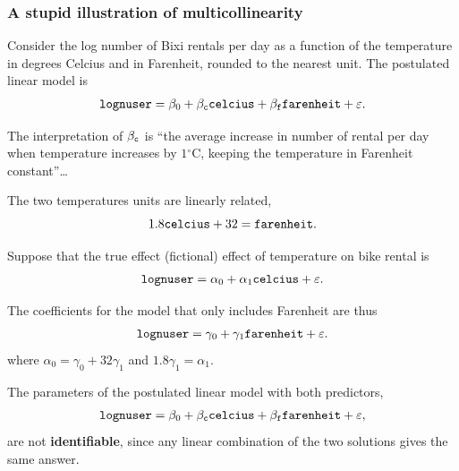 \documentclass{beamer}
\begin{document}
\begin{frame}
\frametitle{A stupid illustration of multicollinearity}
\bi
\item Consider the log number of Bixi rentals per day as a function of the temperature in degrees Celcius and in Farenheit, rounded to the nearest unit. The postulated linear model is 
\begin{align*}
 \texttt{lognuser} = \beta_0 + \beta_{\texttt{c}} \texttt{celcius} + \beta_{\texttt{f}} \texttt{farenheit} + \varepsilon.
\end{align*}
\item The interpretation of $\beta_{\texttt{c}}$ is ``the average increase in number of rental per day when temperature increases by $1{}^{\circ}$C, keeping the temperature in Farenheit constant''\ldots
\item The two temperatures units are linearly related,
\[1.8 \texttt{celcius} + 32 = \texttt{farenheit}.\]
\ei
\end{frame}
\begin{frame}
\bi \item 
 Suppose that the true effect (fictional) effect of temperature on bike rental is 
 \begin{align*}
  \texttt{lognuser} = \alpha_0+ \alpha_1 \texttt{celcius} + \varepsilon.
 \end{align*}
\item The coefficients for the model that only includes Farenheit are thus
 \begin{align*}
  \texttt{lognuser} = \gamma_0 + \gamma_1\texttt{farenheit} + \varepsilon.
 \end{align*}
 where $\alpha_0 = \gamma_0 + 32\gamma_1$ and $1.8\gamma_1 = \alpha_1$.
 \item The parameters of the postulated linear model with both predictors, 
 \begin{align*}
 \texttt{lognuser} = \beta_0 + \beta_{\texttt{c}} \texttt{celcius} + \beta_{\texttt{f}} \texttt{farenheit} + \varepsilon,
\end{align*}
 are not \textbf{identifiable}, since any linear combination of the two solutions 
gives the same answer.
\ei
\end{frame}
\end{document}
